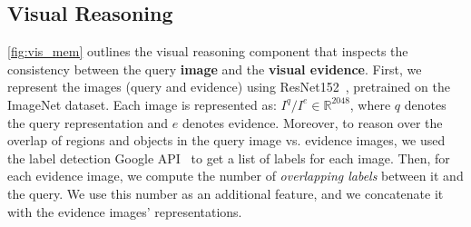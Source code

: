 \subsection{Visual Reasoning}
\autoref{fig:vis_mem} outlines the visual reasoning component that inspects the consistency between the query \textbf{\textcolor{myOrange}{image}} and the \textbf{\textcolor{myOrange}{visual evidence}}. First, we represent the images (query and evidence) using ResNet152~\cite{he2016deep}, pretrained on the ImageNet dataset. Each image is represented as: $I^q/I^e\in\mathbb{R}^{2048}$, where $q$ denotes the query representation and $e$ denotes evidence. 
Moreover, to reason over the overlap of regions and objects in the query image vs. evidence images, we used the label detection Google API~\cite{google2} to get a list of labels for each image. Then, for each evidence image, we compute the number of \textit{overlapping labels} between it and the query. We use this number as an additional feature, and we concatenate it with the evidence images' representations. 

